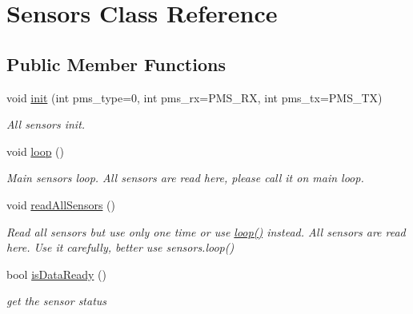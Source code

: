 \hypertarget{classSensors}{}\section{Sensors Class Reference}
\label{classSensors}
\subsection*{Public Member Functions}
\begin{DoxyCompactItemize}
\item 
void \hyperlink{classSensors_a019efdf3e65081e9ace94e1f05338e4b}{init} (int pms\+\_\+type=0, int pms\+\_\+rx=P\+M\+S\+\_\+\+RX, int pms\+\_\+tx=P\+M\+S\+\_\+\+TX)
\begin{DoxyCompactList}\small\item\em All sensors init. \end{DoxyCompactList}\item 
\mbox{\label{classSensors_a255ece4e475221edb8ba7a8983014a76}} 
void \hyperlink{classSensors_a255ece4e475221edb8ba7a8983014a76}{loop} ()
\begin{DoxyCompactList}\small\item\em Main sensors loop. All sensors are read here, please call it on main loop. \end{DoxyCompactList}\item 
\mbox{\label{classSensors_a4cd0c5e7d7c7230b32e8313e5f652a9d}} 
void \hyperlink{classSensors_a4cd0c5e7d7c7230b32e8313e5f652a9d}{read\+All\+Sensors} ()
\begin{DoxyCompactList}\small\item\em Read all sensors but use only one time or use \hyperlink{classSensors_a255ece4e475221edb8ba7a8983014a76}{loop()} instead. All sensors are read here. Use it carefully, better use sensors.\+loop() \end{DoxyCompactList}\item 
\mbox{\label{classSensors_a63ec661795621129a831a6f837c7f560}} 
bool \hyperlink{classSensors_a63ec661795621129a831a6f837c7f560}{is\+Data\+Ready} ()
\begin{DoxyCompactList}\small\item\em get the sensor status \end{DoxyCompactList}\item 
\mbox{\label{classSensors_ac723c0d9cf5af5daa0fa8d041f41f3d8}} 

\end{DoxyCompactItemize}
